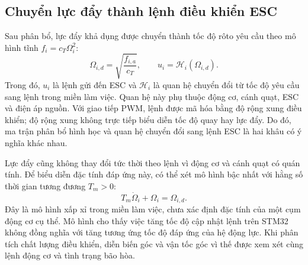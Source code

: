 
\subsection{Chuyển lực đẩy thành lệnh điều khiển ESC}

Sau phân bổ, lực đẩy khả dụng được chuyển thành tốc độ rôto yêu cầu theo mô hình tĩnh $f_i=c_T\Omega_i^2$:
\begin{equation}
	\Omega_{i,d}=\sqrt{\frac{f_{i,a}}{c_T}},
	\qquad u_i=\mathcal H_i(\Omega_{i,d}).
	\label{eq:background-motor-command}
\end{equation}
Trong đó, $u_i$ là lệnh gửi đến ESC và $\mathcal H_i$ là quan hệ chuyển đổi từ tốc độ yêu cầu sang lệnh trong miền làm việc. Quan hệ này phụ thuộc động cơ, cánh quạt, ESC và điện áp nguồn. Với giao tiếp PWM, lệnh được mã hóa bằng độ rộng xung điều khiển; độ rộng xung không trực tiếp biểu diễn tốc độ quay hay lực đẩy. Do đó, ma trận phân bổ hình học và quan hệ chuyển đổi sang lệnh ESC là hai khâu có ý nghĩa khác nhau.

Lực đẩy cũng không thay đổi tức thời theo lệnh vì động cơ và cánh quạt có quán tính. Để biểu diễn đặc tính đáp ứng này, có thể xét mô hình bậc nhất với hằng số thời gian tương đương $T_m>0$:
\begin{equation}
	T_m\dot\Omega_i+\Omega_i=\Omega_{i,d}.
	\label{eq:background-motor-lag}
\end{equation}
Đây là mô hình xấp xỉ trong miền làm việc, chưa xác định đặc tính của một cụm động cơ cụ thể. Mô hình cho thấy việc tăng tốc độ cập nhật lệnh trên STM32 không đồng nghĩa với tăng tương ứng tốc độ đáp ứng của hệ động lực. Khi phân tích chất lượng điều khiển, diễn biến góc và vận tốc góc vì thế được xem xét cùng lệnh động cơ và tình trạng bão hòa.

